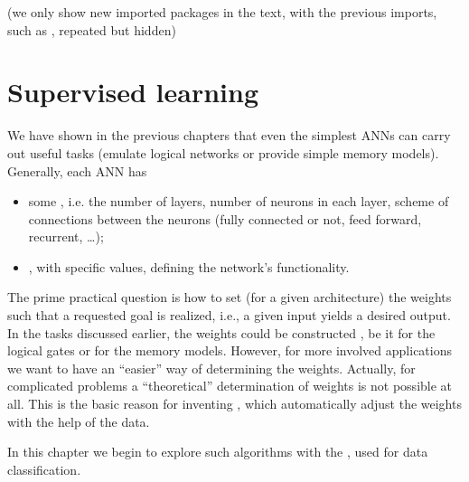 \documentclass[letterpaper,10pt,english]{jupyterBook}
\begin{document}
\begin{sphinxVerbatim}[commandchars=\\\{\}]
   
\end{sphinxVerbatim}

\sphinxAtStartPar
(we only show new imported packages in the text, with the previous imports, such as , repeated but hidden)


\section{Supervised learning}
\label{\detokenize{docs/perceptron:supervised-learning}}
\sphinxAtStartPar
We have shown in the previous chapters that even the simplest ANNs can carry out useful tasks (emulate logical networks or provide simple memory models). Generally, each ANN has
\begin{itemize}
\item {} 
\sphinxAtStartPar
some , i.e. the number of layers, number of neurons in each layer, scheme of connections between the neurons (fully connected or not, feed forward, recurrent, …);

\item {} 
\sphinxAtStartPar
{}, with specific values, defining the network’s functionality.

\end{itemize}

\sphinxAtStartPar
The prime practical question is how to set (for a given architecture) the weights such that a requested goal is realized, i.e., a given input yields a desired output.
In the tasks discussed earlier, the weights could be constructed , be it for the logical gates or for the memory models. However, for more involved applications we want to have an “easier” way of determining the weights. Actually, for complicated problems a “theoretical” determination of weights is not possible at all. This is the basic reason for inventing , which automatically adjust the weights with the help of the data.

\sphinxAtStartPar
In this chapter we begin to explore such algorithms with the , used for data classification.
\end{document}
